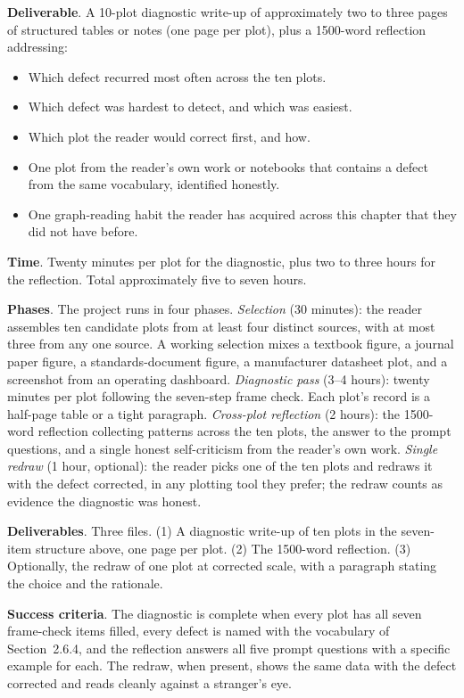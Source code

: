 \begin{project}
\textbf{Deliverable}. A 10-plot diagnostic write-up of approximately
two to three pages of structured tables or notes (one page per
plot), plus a 1500-word reflection addressing:

\begin{itemize}[leftmargin=*]
  \item Which defect recurred most often across the ten plots.
  \item Which defect was hardest to detect, and which was easiest.
  \item Which plot the reader would correct first, and how.
  \item One plot from the reader's own work or notebooks that
    contains a defect from the same vocabulary, identified honestly.
  \item One graph-reading habit the reader has acquired across this
    chapter that they did not have before.
\end{itemize}

\textbf{Time}. Twenty minutes per plot for the diagnostic, plus two
to three hours for the reflection. Total approximately five to seven
hours.

\textbf{Phases}. The project runs in four phases.
\emph{Selection} (30 minutes): the reader assembles ten candidate
plots from at least four distinct sources, with at most three from
any one source. A working selection mixes a textbook figure, a
journal paper figure, a standards-document figure, a manufacturer
datasheet plot, and a screenshot from an operating dashboard.
\emph{Diagnostic pass} (3--4 hours): twenty minutes per plot
following the seven-step frame check. Each plot's record is a
half-page table or a tight paragraph.
\emph{Cross-plot reflection} (2 hours): the 1500-word reflection
collecting patterns across the ten plots, the answer to the prompt
questions, and a single honest self-criticism from the reader's own
work.
\emph{Single redraw} (1 hour, optional): the reader picks one of the
ten plots and redraws it with the defect corrected, in any plotting
tool they prefer; the redraw counts as evidence the diagnostic was
honest.

\textbf{Deliverables}. Three files. (1) A diagnostic write-up of
ten plots in the seven-item structure above, one page per plot.
(2) The 1500-word reflection. (3) Optionally, the redraw of one
plot at corrected scale, with a paragraph stating the choice and
the rationale.

\textbf{Success criteria}. The diagnostic is complete when every
plot has all seven frame-check items filled, every defect is named
with the vocabulary of Section~2.6.4, and the reflection answers
all five prompt questions with a specific example for each. The
redraw, when present, shows the same data with the defect
corrected and reads cleanly against a stranger's eye.


\end{project}
